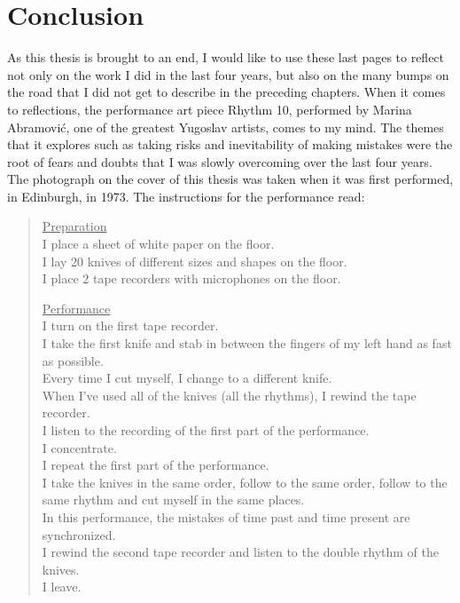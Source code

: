 \chapter{Conclusion}
\label{ch:conclusion}
 
As this thesis is brought to an end, I would like to use these last pages to
reflect not only on the work I did in the last four years, but also on the
many bumps on the road that I did not get to describe in the preceding chapters.
When it comes to reflections, the  performance art piece Rhythm 10, performed by
Marina Abramovi\'c,  one of the greatest Yugoslav artists, comes to my mind. The
themes that it explores such as taking risks and inevitability of making
mistakes were the root of fears and doubts that I was slowly overcoming over the
last four years. The photograph on the cover of this thesis was taken when it
was first performed, in Edinburgh, in 1973. The instructions for the performance read:

\begin{quote}
    \underline{Preparation} \\[1\jot]
    I place a sheet of white paper on the floor.\\
    I lay 20 knives of different sizes and shapes on the floor.\\
    I place 2 tape recorders with microphones on the floor.
    
    \underline{Performance} \\[1\jot]
    I turn on the first tape recorder.\\
    I take the first knife and stab in between the fingers of my left hand as
    fast as possible.\\
    Every time I cut myself, I change to a different knife. \\
    When I've used all of the knives (all the rhythms), I rewind the tape
    recorder. \\ 
    I listen to the recording of the first part of the performance. \\ I
    concentrate. \\
    I repeat the first part of the performance. \\
    I take the knives in the same order, follow to the same order, follow to the
    same rhythm and cut myself in the same places. \\
    In this performance, the mistakes of time past and time present are
    synchronized.\\
    I rewind the second tape recorder and listen to the double rhythm of the
    knives.\\
    I leave.
\end{quote}

